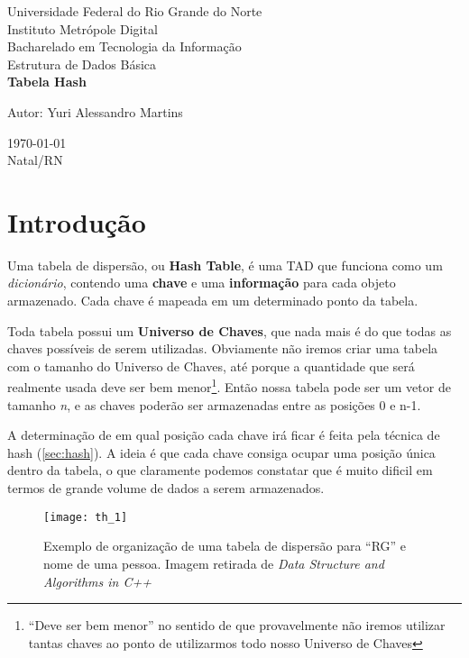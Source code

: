 \documentclass[12pt, a4paper]{article}
\begin{document}
\begin{titlepage}
\begin{center}
{\large Universidade Federal do Rio Grande do Norte}\\[0.2cm]
{\large Instituto Metrópole Digital}\\[0.2cm]
{\large Bacharelado em Tecnologia da Informação}\\[0.2cm]
{\large Estrutura de Dados Básica}\\[5.1cm]
{\bf \huge Tabela Hash}\\[5.1cm]
\end{center}
{\large Autor: Yuri Alessandro Martins}\\[0.7cm]
\begin{center}
{\large \today}\\
{\large Natal/RN}\\[0.2cm]
\end{center}
\end{titlepage}

\tableofcontents
\clearpage

\section{Introdução}

Uma tabela de dispersão, ou \textbf{Hash Table}, é uma TAD que funciona como um \textit{dicionário}, contendo uma \textbf{chave} e uma \textbf{informação} para cada objeto armazenado. Cada chave é mapeada em um determinado ponto da tabela. 

Toda tabela possui um \textbf{Universo de Chaves}, que nada mais é do que todas as chaves possíveis de serem utilizadas.  Obviamente não iremos criar uma tabela com o tamanho do Universo de Chaves, até porque a quantidade que será realmente usada deve ser bem menor\footnote{``Deve ser bem menor'' no sentido de que provavelmente não iremos utilizar tantas chaves ao ponto de utilizarmos todo nosso Universo de Chaves}. Então nossa tabela pode ser um vetor de tamanho \textit{n}, e as chaves poderão ser armazenadas entre as posições 0 e n-1. 

A determinação de em qual posição cada chave irá ficar é feita pela técnica de hash (\ref{sec:hash}). A ideia é que cada chave consiga ocupar uma posição única dentro da tabela, o que claramente podemos constatar que é muito dificil em termos de grande volume de dados a serem armazenados.

\begin{figure}[!h]
\centering
\texttt{[image: th\_1]}
\caption{Exemplo de organização de uma tabela de dispersão para ``RG'' e nome de uma pessoa. Imagem retirada de \textit{Data Structure and Algorithms in C++}\cite{Weiss:1998:DSA:521187}}
\label{hash1}
\end{figure}
\end{document}
